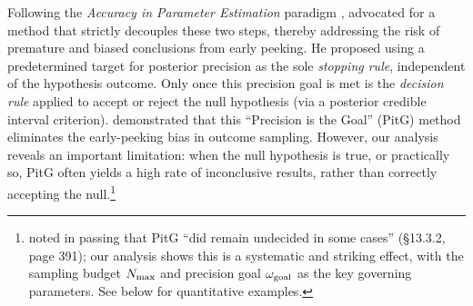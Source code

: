 Following the \textit{Accuracy in Parameter Estimation} paradigm \citep{maxwell2008},
\cite{kruschke2015doing} advocated for a method that strictly decouples these two steps,
thereby addressing the risk of premature and biased conclusions from early peeking.
He proposed using a predetermined target for posterior precision as the
sole \textit{stopping rule}, independent of the hypothesis outcome. Only once this precision goal
is met is the \textit{decision rule} applied to accept or reject the null hypothesis
(via a posterior credible interval criterion).
\cite{kruschke2015doing} demonstrated that this ``Precision is the Goal'' (PitG) method
eliminates the early-peeking bias in outcome sampling. However, our analysis reveals an important
limitation: when the null hypothesis is true, or practically so, PitG often yields a high rate of inconclusive
results, rather than correctly accepting the null.\footnote{\citealt{kruschke2015doing} noted in passing that PitG ``did remain undecided
in some cases'' (\S13.3.2, page 391); our analysis shows this is a systematic and
striking effect, with the sampling budget $N_{\rm max}$ and precision goal $\omega_{\rm goal}$
as the key governing parameters. See below for quantitative examples.}

